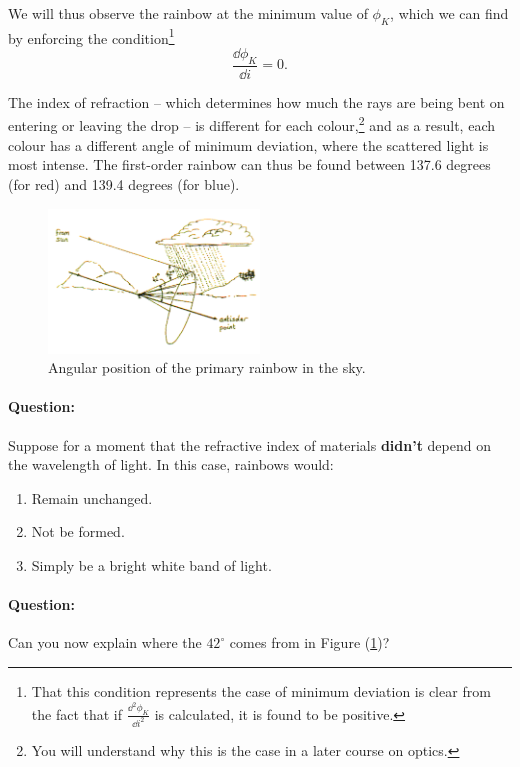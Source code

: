 We will thus observe the rainbow at the minimum value of $\phi_K$, which we can find by enforcing the condition\footnote{That this condition represents the case of minimum deviation is clear from the fact that if $\frac{\dd^2 \phi_K}{\dd i^2}$ is calculated, it is found to be positive.}  $$\frac{\dd\phi_K}{\dd i}=0.$$

\begin{imp}
The index of refraction -- which determines how much the rays are being bent on entering or leaving the drop -- is different for each colour,\footnote{You will understand why this is the case in a later course on optics.} and as a result, each colour has a different angle of minimum deviation, where the scattered light is most intense. The first-order rainbow can thus be found between 137.6 degrees (for red) and 139.4 degrees (for blue).
\end{imp}

\begin{figure}[!htb]
    \centering
    \includegraphics[width=0.5\textwidth]{figs/rainarc.png}
    \caption{Angular position of the primary rainbow in the sky.}
    \label{fig:rainbowSky}
\end{figure}


\begin{question}
\paragraph{Question:} Suppose for a moment that the refractive index of materials \textbf{didn't} depend on the wavelength of light. In this case, rainbows would:
\begin{enumerate}
\itemsep0em
    \item Remain unchanged.
    \item Not be formed.
    \item Simply be a bright white band of light.
\end{enumerate}

\paragraph{Question:} Can you now explain where the $42^\circ$ comes from in Figure (\ref{fig:rainbowSky})?
\end{question}

